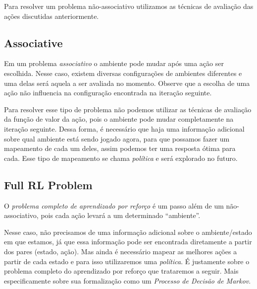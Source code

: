 \documentclass{article}
\begin{document}
            \begin{center}
                \simplebandit
            \end{center}
            
            Para resolver um problema não-associativo utilizamos as técnicas de avaliação das ações discutidas anteriormente.
    
        \subsection{Associative}
        
            Em um problema \emph{associativo} o ambiente pode mudar após uma ação ser escolhida. Nesse caso, existem diversas configurações de ambientes diferentes e uma delas será aquela a ser avaliada no momento. Observe que a escolha de uma ação não influencia na configuração encontrada na iteração seguinte.
    
            \begin{center}
                \associativebandits
            \end{center}
            
            Para resolver esse tipo de problema não podemos utilizar as técnicas de avaliação da função de valor da ação, pois o ambiente pode mudar completamente na iteração seguinte. Dessa forma, é necessário que haja uma informação adicional sobre qual ambiente está sendo jogado agora, para que possamos fazer um mapeamento de cada um deles, assim podemos ter uma resposta ótima para cada. Esse tipo de mapeamento se chama \emph{política} e será explorado no futuro.
            
        \subsection{Full RL Problem}
        
            O \emph{problema completo de aprendizado por reforço} é um passo além de um não-associativo, pois cada ação levará a um determinado ``ambiente''. 
        
            \begin{center}
                \fullrldiagram
            \end{center}
            
            Nesse caso, não precisamos de uma informação adicional sobre o ambiente/estado em que estamos, já que essa informação pode ser encontrada diretamente a partir dos pares (estado, ação). Mas ainda é necessário mapear as melhores ações a partir de cada estado e para isso utilizaremos uma \emph{política}. É justamente sobre o problema completo do aprendizado por reforço que trataremos a seguir. Mais especificamente sobre sua formalização como um \emph{Processo de Decisão de Markov}.
            
\end{document}

